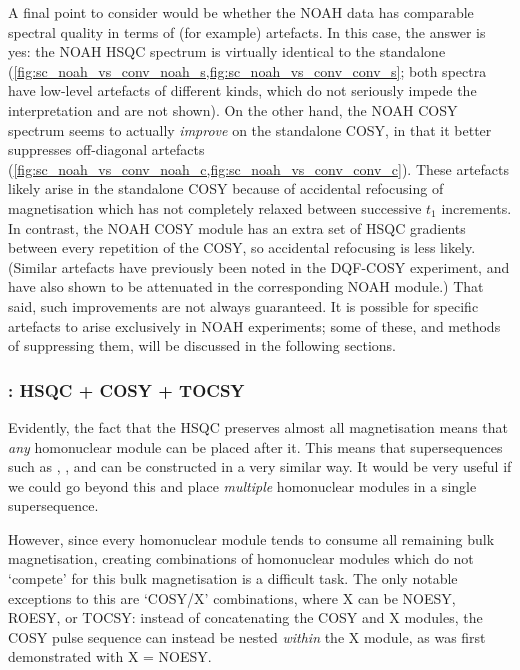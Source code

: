 A final point to consider would be whether the NOAH data has comparable spectral quality in terms of (for example) artefacts.
In this case, the answer is yes: the NOAH HSQC spectrum is virtually identical to the standalone (\cref{fig:sc_noah_vs_conv_noah_s,fig:sc_noah_vs_conv_conv_s}; both spectra have low-level artefacts of different kinds, which do not seriously impede the interpretation and are not shown).
On the other hand, the NOAH COSY spectrum seems to actually \textit{improve} on the standalone COSY, in that it better suppresses off-diagonal artefacts (\cref{fig:sc_noah_vs_conv_noah_c,fig:sc_noah_vs_conv_conv_c}).
These artefacts likely arise in the standalone COSY because of accidental refocusing of magnetisation which has not completely relaxed between successive $t_1$ increments.\autocite{Vitorge2010JMR}
In contrast, the NOAH COSY module has an extra set of HSQC gradients between every repetition of the COSY, so accidental refocusing is less likely.
(Similar artefacts have previously been noted in the DQF-COSY experiment\autocite{Shaw1996JMRSA,Howe2014MRC}, and have also shown to be attenuated in the corresponding NOAH module\autocite{Claridge2019MRC}.)
That said, such improvements are not always guaranteed.
It is possible for specific artefacts to arise exclusively in NOAH experiments; some of these, and methods of suppressing them, will be discussed in the following sections.


\subsubsection{: HSQC + COSY + TOCSY}

Evidently, the fact that the HSQC preserves almost all  magnetisation means that \textit{any} homonuclear module can be placed after it.
This means that supersequences such as , , and  can be constructed in a very similar way.
It would be very useful if we could go beyond this and place \textit{multiple} homonuclear modules in a single supersequence.

However, since every homonuclear module tends to consume all remaining bulk magnetisation, creating combinations of homonuclear modules which do not `compete' for this bulk magnetisation is a difficult task.
The only notable exceptions to this are `COSY/X' combinations, where X can be NOESY, ROESY, or TOCSY: instead of concatenating the COSY and X modules, the COSY pulse sequence can instead be nested \textit{within} the X module, as was first demonstrated with X = NOESY\autocite{Haasnoot1984JMR,Gurevich1984JMR}.

